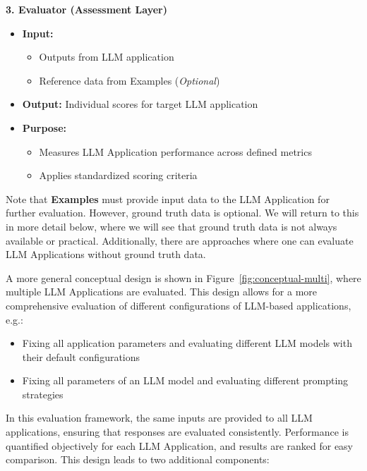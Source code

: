 \textbf{3. Evaluator (Assessment Layer)}
\begin{itemize}
    \item \textbf{Input:}
    \begin{itemize}
        \item Outputs from LLM application
        \item Reference data from Examples (\textit{Optional})
    \end{itemize}
    \item \textbf{Output:} Individual scores for target LLM application
    \item \textbf{Purpose:}
    \begin{itemize}
        \item Measures LLM Application performance across defined metrics
        \item Applies standardized scoring criteria
    \end{itemize}
\end{itemize}
Note that \textbf{Examples} must provide input data to the LLM Application for further evaluation. However, ground truth data is optional. We will return to this in more detail below, where we will see that ground truth data is not always available or practical. Additionally, there are approaches where one can evaluate LLM Applications without ground truth data.

A more general conceptual design is shown in Figure~\ref{fig:conceptual-multi}, where multiple LLM Applications are evaluated. This design allows for a more comprehensive evaluation of different configurations of LLM-based applications, e.g.:
\begin{itemize}
    \item Fixing all application parameters and evaluating different LLM models with their default configurations
    \item Fixing all parameters of an LLM model and evaluating different prompting strategies
\end{itemize}

\begin{figure*}[h]
\centering

\caption{Conceptual overview of Multiple LLM-based applications evaluation.}
\label{fig:conceptual-multi}
\end{figure*}

In this evaluation framework, the same inputs are provided to all LLM applications, ensuring that responses are evaluated consistently. Performance is quantified objectively for each LLM Application, and results are ranked for easy comparison. This design leads to two additional components:

